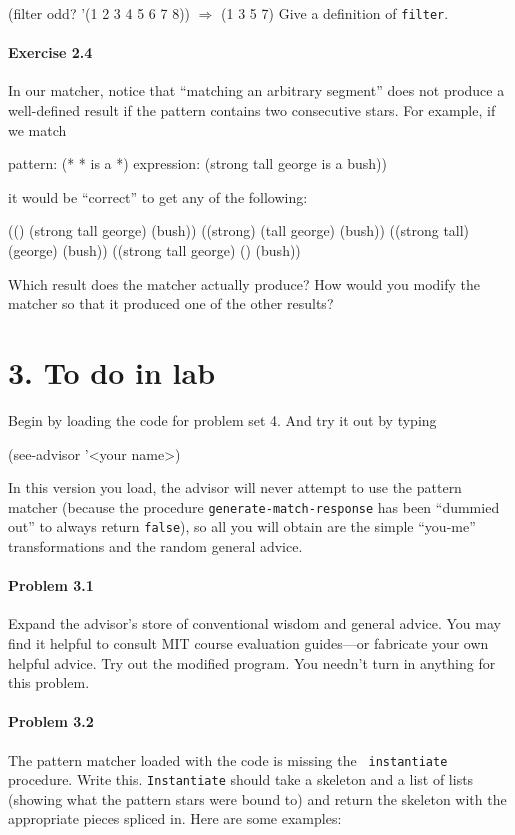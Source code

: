 \beginlisp
(filter odd? '(1 2 3 4 5 6 7 8)) $\Rightarrow$ (1 3 5 7)
\endlisp
Give a definition of {\tt filter}.

\paragraph{Exercise 2.4}

In our matcher, notice that ``matching an arbitrary segment'' does
not produce a well-defined result if the pattern contains two
consecutive stars.  For example, if we match

\beginlisp
pattern:    (* * is a *)
expression: (strong tall george is a bush))
\endlisp

\noindent
it would be ``correct'' to get any of the following:

\beginlisp
(() (strong tall george) (bush))
((strong) (tall george) (bush))
((strong tall) (george) (bush))
((strong tall george) () (bush))
\endlisp

Which result does the matcher actually produce?  How would you modify
the matcher so that it produced one of the other results?


\section{3. To do in lab}

Begin by loading the code for problem set 4.  And try it out by typing

\beginlisp
(see-advisor '<your name>)
\endlisp

In this version you load, the advisor will never attempt to use the
pattern matcher (because the procedure {\tt generate-match-response}
has been ``dummied out'' to always return {\tt false}),  so all you
will obtain are the simple ``you-me'' transformations and the random
general advice.


\paragraph{Problem 3.1}
Expand the advisor's store of conventional wisdom and general advice.
You may find it helpful to consult MIT course evaluation guides---or
fabricate your own helpful advice.  Try out the modified program.  You
needn't turn in anything for this problem.

\paragraph{Problem 3.2}
The pattern matcher loaded with the code is missing the {\tt
instantiate} procedure.  Write this.  {\tt Instantiate} should
take a skeleton and a list of lists (showing what the pattern stars
were bound to) and return the skeleton with the appropriate pieces
spliced in.  Here are some examples:

